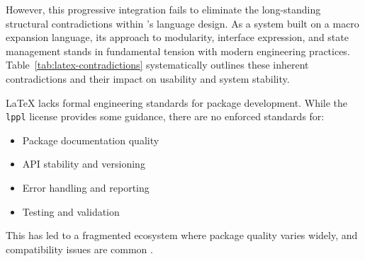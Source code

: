 However, this progressive integration fails to eliminate the long-standing structural contradictions within \LaTeXe{}'s language design. As a system built on a macro expansion language, its approach to modularity, interface expression, and state management stands in fundamental tension with modern engineering practices. Table~\ref{tab:latex-contradictions} systematically outlines these inherent contradictions and their impact on usability and system stability.

\LaTeX{} lacks formal engineering standards for package development. While the \texttt{lppl} license provides some guidance, there are no enforced standards for:

\begin{itemize}
    \item Package documentation quality
    \item API stability and versioning
    \item Error handling and reporting
    \item Testing and validation
\end{itemize}

This has led to a fragmented ecosystem where package quality varies widely, and compatibility issues are common \cite{interview2021}.

